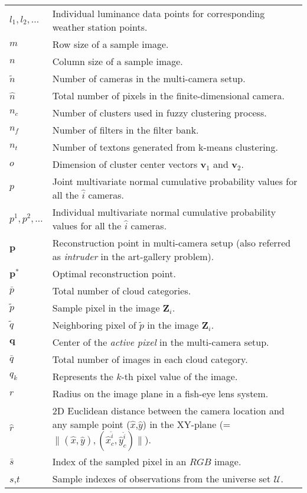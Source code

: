 \begin{longtable}[l]{p{80pt}p{320pt}}
$l_1, l_2,\ldots$ & Individual luminance data points for corresponding weather station points. \\
$m$ & Row size of a sample image. \\
$n$ & Column size of a sample image. \\
$\tilde{n}$ & Number of cameras in the multi-camera setup.\\
$\hat{n}$ & Total number of pixels in the finite-dimensional camera.\\
$n_c$ & Number of clusters used in fuzzy clustering process. \\
$n_f$ & Number of filters in the filter bank.\\
$n_t$ & Number of textons generated from k-means clustering.\\
$o$ & Dimension of cluster center vectors $\mathbf{v}_{1}$ and $\mathbf{v}_{2}$. \\
$p$ & Joint multivariate normal cumulative probability values for all the $\hat{i}$ cameras. \\
$p^1, p^2,\ldots$ & Individual multivariate normal cumulative probability values for all the $\hat{i}$ cameras. \\
$\mathbf{p}$ & Reconstruction point in multi-camera setup (also referred as \emph{intruder} in the art-gallery problem). \\
$\mathbf{p}^{*}$ & Optimal reconstruction point. \\
$\bar{p}$ & Total number of cloud categories. \\
$\tilde{p}$ & Sample pixel in the image $\mathbf{Z}_i$. \\
$\tilde{q}$ & Neighboring pixel of $\tilde{p}$ in the image $\mathbf{Z}_i$. \\
$\mathbf{q}$ & Center of the \emph{active pixel} in the multi-camera setup. \\
$\bar{q}$ & Total number of images in each cloud category. \\
$q_k$ & Represents the $k$-th pixel value of the image. \\
$r$ & Radius on the image plane in a fish-eye lens system. \\
$\hat{r}$ & 2D Euclidean distance between the camera location and any sample point ($\hat{x}$,$\hat{y}$) in the XY-plane (=$\lVert (\hat{x},\hat{y}) , (\hat{x}_c^{\hat{i}},\hat{y}_c^{\hat{i}}) \rVert$).\\
$\bar{s}$ & Index of the sampled pixel in an $RGB$ image. \\
$s$,$t$ & Sample indexes of observations from the universe set $\mathcal{U}$. \\

\end{longtable}
